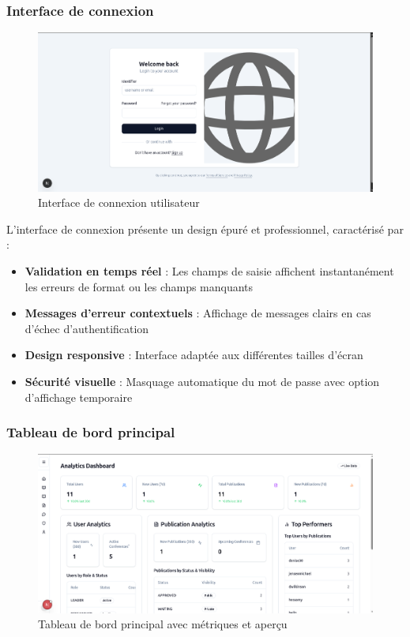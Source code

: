 \documentclass[12pt]{rapportPfe}
\begin{document}
\subsubsection{Interface de connexion}

\begin{figure}[H]
    \centering
    \includegraphics[width=1\textwidth]{diagrams/a_ss_02.png}
    \caption{Interface de connexion utilisateur}
    \label{fig:login}
\end{figure}

L'interface de connexion présente un design épuré et professionnel, caractérisé par :
\begin{itemize}
    \item \textbf{Validation en temps réel} : Les champs de saisie affichent instantanément les erreurs de format ou les champs manquants
    \item \textbf{Messages d'erreur contextuels} : Affichage de messages clairs en cas d'échec d'authentification
    \item \textbf{Design responsive} : Interface adaptée aux différentes tailles d'écran
    \item \textbf{Sécurité visuelle} : Masquage automatique du mot de passe avec option d'affichage temporaire
\end{itemize}

\subsubsection{Tableau de bord principal}

\begin{figure}[H]
    \centering
    \includegraphics[width=1\textwidth]{diagrams/a_ss_08.png}
    \caption{Tableau de bord principal avec métriques et aperçu}
    \label{fig:dashboard}
\end{figure}
\end{document}
